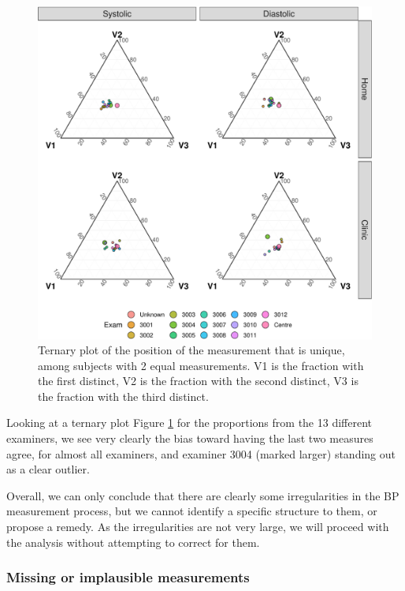 \documentclass[
]{article}
\begin{document}
\begin{figure}
\centering
\includegraphics{Appendix_files/figure-latex/ternaryPlot-1.pdf}
\caption{\label{fig:ternaryPlot}Ternary plot of the position of the measurement that is unique, among subjects with 2 equal measurements. V1 is the fraction with the first distinct, V2 is the fraction with the second distinct, V3 is the fraction with the third distinct.}
\end{figure}

Looking at a ternary plot Figure \ref{fig:ternaryPlot} for the proportions from the 13 different examiners, we see very clearly the bias toward having the last two measures agree, for almost all examiners, and examiner 3004 (marked larger) standing out as a clear outlier.

Overall, we can only conclude that there are clearly some irregularities in the BP measurement process, but we cannot identify a specific structure to them, or propose a remedy.
As the irregularities are not very large, we will proceed with the analysis without attempting to correct for them.

\hypertarget{sec:BPrange}{%
\subsubsection{Missing or implausible measurements}\label{sec:BPrange}}
\end{document}
